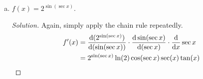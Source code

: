 \documentclass{agony}
\begin{document}
\begin{enumerate}[(a)]
\begin{proof}[Solution]
\begin{align*}
             & = \frac{2\tan x \sec^2x}{\sqrt{2\tan^2x+3}} \qedhere
          \end{align*}
        \end{proof}
  \item $f(x)=2^{\sin(\sec x)}$.
        \begin{proof}[Solution]
          Again, simply apply the chain rule repeatedly.
          \begin{align*}
            f'(x)
             & = \dv{(2^{\sin(\sec x)})}{(\sin(\sec x))}\cdot\dv{\sin(\sec x)}{(\sec x)}\cdot\dv{x}\sec x \\
             & = 2^{\sin(\sec x)}\ln(2)\cos(\sec x)\sec(x)\tan(x) \qedhere
          \end{align*}
        \end{proof}
\end{enumerate}
\end{document}
